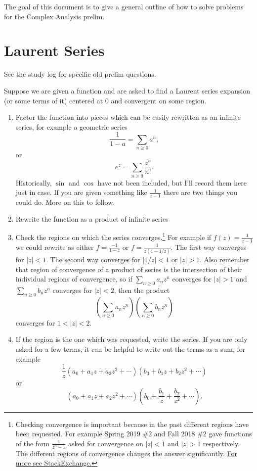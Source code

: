 \documentclass[10pt]{article}
\begin{document}
The goal of this document is to give a general outline of how to solve problems for the Complex Analysis prelim.

\section{Laurent Series}
See the study log for specific old prelim questions.


Suppose we are given a function and are asked to find a Laurent series expansion (or some terms of it) centered at $0$ and convergent on some region. 
\begin{enumerate}
	\item Factor the function into pieces which can be easily rewritten as an infinite series, for example a geometric series \[\frac{1}{1- a} = \sum_{n \geq 0} a^n,\] or \[e^z = \sum_{n\geq 0} \frac{z^n}{n!}.\] 
	Historically, $\sin$ and $\cos$ have not been included, but I'll record them here just in case.
	If you are given something like $\frac{1}{z-1}$ there are two things you could do. More on this to follow.
	\item Rewrite the function as a product of infinite series
	\item Check the regions on which the series converges.\footnote{Checking convergence is important because in the past different regions have been requested. For example Spring 2019 \#2 and Fall 2018 \#2 gave functions of the form $\frac{1}{z^n-1}$ asked for convergence on $|z|<1$ and $|z|>1$ respectively. The different regions of convergence changes the answer significantly. \href{https://math.stackexchange.com/questions/2553132/laurent-series-for-different-domains}{For more see StackExchange.}} For example if $f(z) = \frac{1}{z-1}$ we could rewrite as either $f = \frac{-1}{1-z}$ or $f = \frac{1}{z(1-1/z)}$. 
	The first way converges for $|z|<1$. The second way converges for $|1/z|<1$ or $|z|>1$. Also remember that region of convergence of a product of series is the intersection of their individual regions of convergence, so if $\sum_{n\geq 0} a_n z^n$ converges for $|z|>1$ and $\sum_{n \geq 0} b_n z^n$ converges for $|z|<2$, then the product
	\[ \left ( \sum_{n\geq 0} a_n z^n\right) \left ( \sum_{n \geq 0} b_n z^n\right)\]
	converges for $1 < |z| < 2$.
	
	
	
	\item If the region is the one which was requested, write the series. 
	If you are only asked for a few terms, it can be helpful to write out the terms as a sum, for example
	\[\frac{1}{z} (a_0 + a_1 z + a_2 z^2 + \cdots ) (b_0 + b_1 z + b_2 z^2 + \cdots)\]
	or 
	\[(a_0 + a_1 z + a_2 z^2 + \cdots ) (b_0 + \frac{b_1 }{z} + \frac{b_2}{z^2} + \cdots).\]
	

\end{enumerate}
\end{document}
